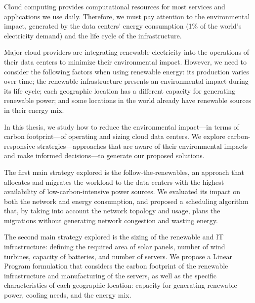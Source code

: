 
Cloud computing provides computational resources for most services and applications we use daily. Therefore, we must pay attention to the environmental impact, generated by the data centers' energy consumption (1\% of the world's electricity demand) and the life cycle of the infrastructure.

Major cloud providers are integrating renewable electricity into the operations of their data centers to minimize their environmental impact. However, we need to consider the following factors when using renewable energy: its production varies over time; the renewable infrastructure presents an environmental impact during its life cycle; each geographic location has a different capacity for generating renewable power; and some locations in the world already have renewable sources in their energy mix.

In this thesis, we study how to reduce the environmental impact---in terms of carbon footprint---of operating and sizing cloud data centers. We explore carbon-responsive strategies---approaches that are aware of their environmental impacts and make informed decisions---to generate our proposed solutions.

The first main strategy explored is the follow-the-renewables, an approach that allocates and migrates the workload to the data centers with the highest availability of low-carbon-intensive power sources. We evaluated its impact on both the network and energy consumption, and proposed a scheduling algorithm that, by taking into account the network topology and usage, plans the migrations without generating network congestion and wasting energy.

The second main strategy explored is the sizing of the renewable and IT infrastructure: defining the required area of solar panels, number of wind turbines, capacity of batteries, and number of servers. We propose a Linear Program formulation that considers the carbon footprint of the renewable infrastructure and manufacturing of the servers, as well as the specific characteristics of each geographic location: capacity for generating renewable power, cooling needs, and the energy mix. 

